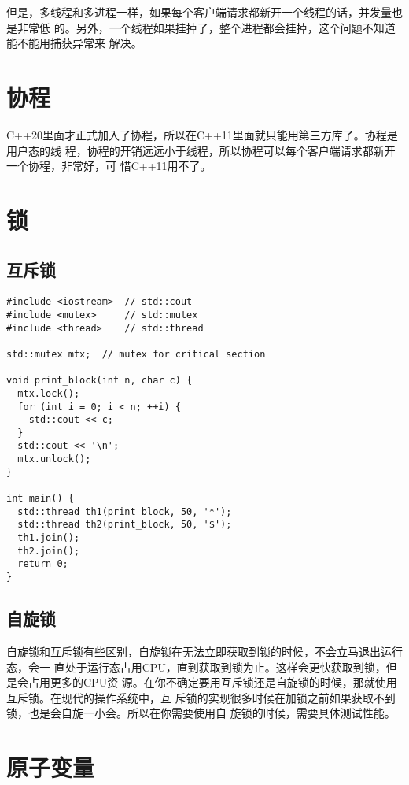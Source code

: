 但是，多线程和多进程一样，如果每个客户端请求都新开一个线程的话，并发量也是非常低
的。另外，一个线程如果挂掉了，整个进程都会挂掉，这个问题不知道能不能用捕获异常来
解决。

\section{协程}

C++20里面才正式加入了协程，所以在C++11里面就只能用第三方库了。协程是用户态的线
程，协程的开销远远小于线程，所以协程可以每个客户端请求都新开一个协程，非常好，可
惜C++11用不了。

\section{锁}

\subsection{互斥锁}

\begin{verbatim}
#include <iostream>  // std::cout
#include <mutex>     // std::mutex
#include <thread>    // std::thread

std::mutex mtx;  // mutex for critical section

void print_block(int n, char c) {
  mtx.lock();
  for (int i = 0; i < n; ++i) {
    std::cout << c;
  }
  std::cout << '\n';
  mtx.unlock();
}

int main() {
  std::thread th1(print_block, 50, '*');
  std::thread th2(print_block, 50, '$');
  th1.join();
  th2.join();
  return 0;
}
\end{verbatim}

\subsection{自旋锁}

自旋锁和互斥锁有些区别，自旋锁在无法立即获取到锁的时候，不会立马退出运行态，会一
直处于运行态占用CPU，直到获取到锁为止。这样会更快获取到锁，但是会占用更多的CPU资
源。在你不确定要用互斥锁还是自旋锁的时候，那就使用互斥锁。在现代的操作系统中，互
斥锁的实现很多时候在加锁之前如果获取不到锁，也是会自旋一小会。所以在你需要使用自
旋锁的时候，需要具体测试性能。

\section{原子变量}

